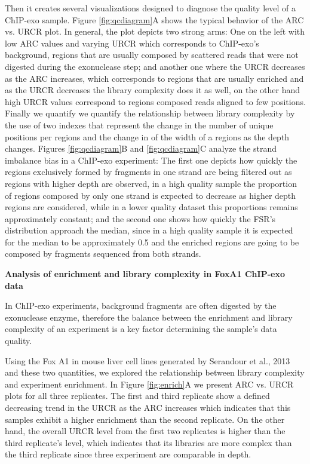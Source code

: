 \documentclass{bmcart}
\begin{document}
Then it creates several visualizations designed to diagnose the
quality level of a ChIP-exo sample. Figure \ref{fig:qcdiagram}A shows
the typical behavior of the ARC vs. URCR plot. In general, the plot
depicts two strong arms: One on the left with low ARC values and
varying URCR which corresponds to ChIP-exo's background, regions that
are usually composed by scattered reads that were not digested during
the exonuclease step; and another one where the URCR decreases as the
ARC increases, which corresponds to regions that are usually enriched
and as the URCR decreases the library complexity does it as well, on
the other hand high URCR values correspond to regions composed reads
aligned to few positions. Finally we quantify we quantify the
relationship between library complexity by the use of two indexes that
represent the change in the number of unique positions per regions and
the change in of the width of a regions as the depth changes. Figures
\ref{fig:qcdiagram}B and \ref{fig:qcdiagram}C analyze the strand
imbalance bias in a ChIP-exo experiment: The first one depicts how
quickly the regions exclusively formed by fragments in one strand are
being filtered out as regions with higher depth are observed, in a
high quality sample the proportion of regions composed by only one
strand is expected to decrease as higher depth regions are considered,
while in a lower quality dataset this proportions remains
approximately constant; and the second one shows how quickly the FSR's
distribution approach the median, since in a high quality sample it is
expected for the median to be approximately 0.5 and the enriched
regions are going to be composed by fragments sequenced from both
strands.

\textbf{Analysis of enrichment and library complexity in FoxA1
  ChIP-exo data}

In ChIP-exo experiments, background fragments are often digested by
the exonuclease enzyme, therefore the balance between the enrichment
and library complexity of an experiment is a key factor determining
the sample's data quality.

Using the Fox A1 in mouse liver cell lines generated by Serandour et
al., 2013\nocite{exoillumina} and these two quantities, we explored
the relationship between library complexity and experiment
enrichment. In Figure \ref{fig:enrich}A we present ARC vs. URCR plots
for all three replicates. The first and third replicate show a defined
decreasing trend in the $\mbox{URCR}$ as the $\mbox{ARC}$ increases
which indicates that this samples exhibit a higher enrichment than the
second replicate. On the other hand, the overall $\mbox{URCR}$ level
from the first two replicates is higher than the third replicate's
level, which indicates that its libraries are more complex than the
third replicate since three experiment are comparable in depth.
\end{document}
